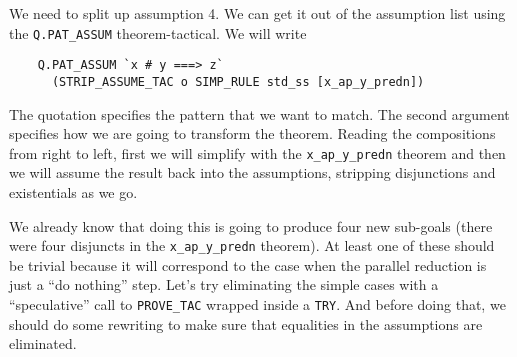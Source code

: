 \documentclass[12pt]{article}
\begin{document}
We need to split up assumption 4.  We can get it out of the assumption
list using the \texttt{Q.PAT\_ASSUM} theorem-tactical.  We will write
\begin{verbatim}
    Q.PAT_ASSUM `x # y ===> z`
      (STRIP_ASSUME_TAC o SIMP_RULE std_ss [x_ap_y_predn])
\end{verbatim}
The quotation specifies the pattern that we want to match.  The second
argument specifies how we are going to transform the theorem.  Reading
the compositions from right to left, first we will simplify with the
\verb!x_ap_y_predn! theorem and then we will assume the result back
into the assumptions, stripping disjunctions and existentials as we
go.

We already know that doing this is going to produce four new sub-goals
(there were four disjuncts in the \verb!x_ap_y_predn! theorem).  At
least one of these should be trivial because it will correspond to the
case when the parallel reduction is just a ``do nothing'' step.  Let's
try eliminating the simple cases with a ``speculative'' call to
\texttt{PROVE\_TAC} wrapped inside a \texttt{TRY}.  And before doing
that, we should do some rewriting to make sure that equalities in the
assumptions are eliminated.
\end{document}
